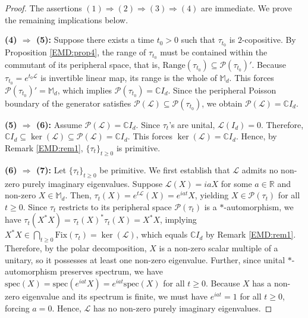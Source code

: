 \documentclass[11pt,reqno]{amsart}
\theoremstyle{definition}
\theoremstyle{plain}
\theoremstyle{remark}
\numberwithin{equation}{section}%
\begin{document}
  \begin{proof}
  	The assertions $(1)\Rightarrow(2)\Rightarrow(3)\Rightarrow(4)$ are immediate. We prove the remaining implications below.
  	
  	  \noindent\textbf{(4) $\Rightarrow$ (5):} Suppose there exists a time $t_0 > 0$ such that $\tau_{t_0}$ is $2$-copositive. By Proposition \ref{EMD:prop4}, the range of $\tau_{t_0}$ must be contained within the commutant of its peripheral space, that is, $\text{Range}(\tau_{t_0}) \subseteq \mathcal{P}(\tau_{t_0})'$. Because $\tau_{t_0} = e^{t_0\mathcal{L}}$ is invertible linear map, its range is the whole of $\mathbb{M}_d$. This forces $\mathcal{P}(\tau_{t_0})' = \mathbb{M}_d$, which implies $\mathcal{P}(\tau_{t_0}) = \mathbb{C}I_d$. Since the peripheral Poisson boundary of the generator satisfies $\mathcal{P}(\mathcal{L}) \subseteq \mathcal{P}(\tau_{t_0})$, we obtain $\mathcal{P}(\mathcal{L}) = \mathbb{C}I_d$.
  	  
  	  
  	  \noindent \textbf{(5) $\Rightarrow$ (6):} Assume $\mathcal{P}(\mathcal{L}) = \mathbb{C}I_d$. Since $\tau_t$'s are unital, $\mathcal{L}(I_d)=0$. Therefore, $\mathbb{C}I_d\subseteq\ker(\mathcal{L})\subseteq \mathcal{P}(\mathcal{L})=\mathbb{C}I_d$. This forces $\ker(\mathcal{L})=\mathbb{C}I_d$. Hence, by Remark \ref{EMD:rem1}, $\{\tau_t\}_{t\geq 0}$ is primitive. 
  	  
  	  
  	  \noindent \textbf{(6) $\Rightarrow$ (7):} Let $\{\tau_t\}_{t\ge0}$ be primitive. We first establish that $\mathcal{L}$ admits no non-zero purely imaginary eigenvalues. Suppose $\mathcal{L}(X) = iaX$ for some $a \in \mathbb{R}$ and non-zero $X \in \mathbb{M}_d$. Then, $\tau_t(X)=e^{t\mathcal{L}}(X)=e^{iat}X$, yielding $X\in\mathcal{P}(\tau_t)$ for all $t\ge 0$. Since $\tau_t$ restricts to its peripheral space $\mathcal{P}(\tau_t)$ is a $*$-automorphism, we have $\tau_t(X^*X)=\tau_t(X)^*\tau_t(X)=X^*X$, implying $X^*X \in\bigcap_{t\ge0}\text{Fix}(\tau_t)= \ker(\mathcal{L})$, which equals $\mathbb{C}I_d$ by Remark \ref{EMD:rem1}. Therefore, by the polar decomposition, $X$ is a non-zero scalar multiple of a unitary, so it possesses at least one non-zero eigenvalue. Further, since unital $*$-automorphism preserves spectrum, we have $\mathrm{spec}(X) = \mathrm{spec}(e^{iat}X) = e^{iat}\mathrm{spec}(X)$ for all $t \ge 0$. Because $X$ has a non-zero eigenvalue and its spectrum is finite, we must have $e^{iat} =1$ for all $t\ge0$, forcing $a = 0$. Hence, $\mathcal{L}$ has no non-zero purely imaginary eigenvalues.
  	  

\end{proof}
\end{document}
